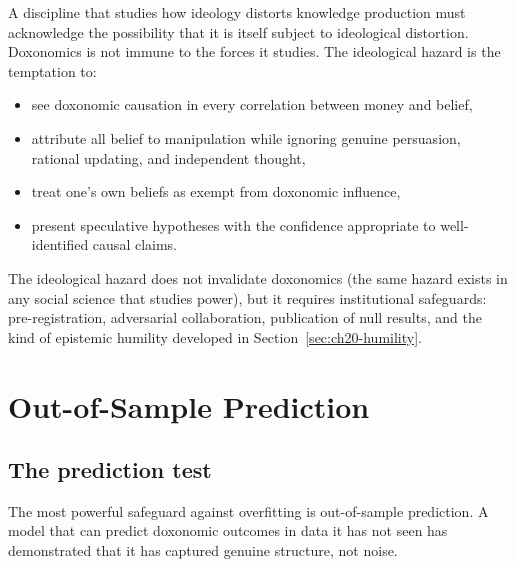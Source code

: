 \begin{principle}
\label{prin:ideological-hazard}
A discipline that studies how ideology distorts knowledge production must acknowledge the possibility that it is itself subject to ideological distortion.
Doxonomics is not immune to the forces it studies.
The ideological hazard is the temptation to:
\begin{itemize}[nosep]
  \item see doxonomic causation in every correlation between money and belief,
  \item attribute all belief to manipulation while ignoring genuine persuasion, rational updating, and independent thought,
  \item treat one's own beliefs as exempt from doxonomic influence,
  \item present speculative hypotheses with the confidence appropriate to well-identified causal claims.
\end{itemize}
\end{principle}

The ideological hazard does not invalidate doxonomics (the same hazard exists in any social science that studies power), but it requires institutional safeguards: pre-registration, adversarial collaboration, publication of null results, and the kind of epistemic humility developed in Section~\ref{sec:ch20-humility}.

\section{Out-of-Sample Prediction}
\label{sec:ch20-prediction}

\subsection{The prediction test}

The most powerful safeguard against overfitting is out-of-sample prediction.
A model that can predict doxonomic outcomes in data it has not seen has demonstrated that it has captured genuine structure, not noise.

